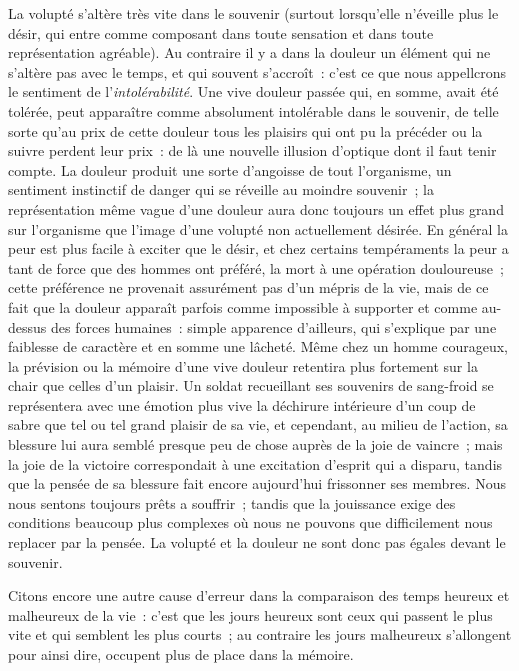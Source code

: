 \documentclass[french,twoside]{book} %
\begin{document}
La volupté s’altère très vite dans le souvenir (surtout lorsqu’elle n’éveille plus le désir, qui entre comme composant dans toute sensation et dans toute représentation agréable). Au contraire il y a dans la douleur un élément qui ne s’altère pas avec le temps, et qui souvent s’accroît : c’est ce que nous appellcrons le sentiment de l’\emph{intolérabilité}. Une vive douleur passée qui, en somme, avait été tolérée, peut apparaître comme absolument intolérable dans le souvenir, de telle sorte qu’au prix de cette douleur tous les plaisirs qui ont pu la précéder ou la suivre perdent leur prix : de là une nouvelle illusion d’optique dont il faut tenir compte. La douleur produit une sorte d’angoisse de tout l’organisme, un sentiment instinctif de danger qui se réveille au moindre souvenir ; la représentation même vague d’une douleur aura donc toujours un effet plus grand sur l’organisme que l’image d’une volupté non actuellement désirée. En général la peur est plus facile à exciter que le désir, et chez certains tempéraments la peur a tant de force que des hommes ont préféré, la mort à une opération douloureuse ; cette préférence ne provenait assurément pas d’un mépris de la vie, mais de ce fait que la douleur apparaît parfois comme impossible à supporter et comme au-dessus des forces humaines : simple apparence d’ailleurs, qui s’explique par une faiblesse de caractère et en somme une lâcheté. Même chez un homme courageux, la prévision ou la mémoire d’une vive douleur retentira plus fortement sur la chair que celles d’un plaisir. Un soldat recueillant ses souvenirs de sang-froid se représentera avec une émotion plus vive la déchirure intérieure d’un coup de sabre que tel ou tel grand plaisir de sa vie, et cependant, au milieu de l’action, sa blessure lui aura semblé presque peu de chose auprès de la joie de vaincre ; mais la joie de la victoire correspondait à une excitation d’esprit qui a disparu, tandis que la pensée de sa blessure fait encore aujourd’hui frissonner ses membres. Nous nous sentons toujours prêts a souffrir ; tandis que la jouissance exige des conditions beaucoup plus complexes où nous ne pouvons que difficilement nous replacer par la pensée. La volupté et la douleur ne sont donc pas égales devant le souvenir.\par
Citons encore une autre cause d’erreur dans la comparaison des temps heureux et malheureux de la vie : c’est que les jours heureux sont ceux qui passent le plus vite et qui semblent les plus courts ; au contraire les jours malheureux s’allongent pour ainsi dire, occupent plus de place dans la mémoire.\par
\end{document}
